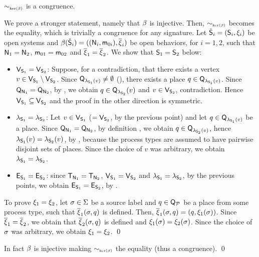 \begin{lemmaE}[][category=proofs]\label{lemma:cong-sys-beh}
  $\sim_{\scriptscriptstyle{\mathrm{ker}(\beta)}}$ is a \hrtext{} congruence. 
\end{lemmaE}
\begin{proofE}
  We prove a stronger statement, namely that $\beta$ is
  injective. Then, $\sim_{\scriptscriptstyle{\mathrm{ker}(\beta)}}$ becomes the equality, which is
  trivially a congruence for any signature. Let $\check{\mathsf{S}}_i =
  (\mathsf{S}_i,\xi_i)$ be open systems and
  $\beta({\check{\mathsf{S}}_i})=((\mathsf{N}_i,\mathsf{m}_{0i}),\overline{\xi}_i)$
  be open behaviors, for $i=1,2$, such that $\mathsf{N}_1=\mathsf{N}_2$,
  $\mathsf{m}_{01}=\mathsf{m}_{02}$ and
  $\overline{\xi}_1=\overline{\xi}_2$. We show that
  $\mathsf{S}_1=\mathsf{S}_2$ below: \begin{itemize}
  \item $\mathsf{V}_{\mathsf{S}_1}=\mathsf{V}_{\mathsf{S}_2}$: Suppose, for a
    contradiction, that there exists a vertex $v \in \mathsf{V}_{\mathsf{S}_1}
    \setminus \mathsf{V}_{\mathsf{S}_2}$. Since
    $\mathsf{Q}_{\lambda_{\mathsf{S}_1}(v)}\neq\emptyset$
    (), there exists a place
    $q\in\mathsf{Q}_{\lambda_{\mathsf{S}_1}(v)}$. Since
    $\mathsf{Q}_{\mathsf{N}_1}=\mathsf{Q}_{\mathsf{N}_2}$, by 
    , we obtain $q\in\mathsf{Q}_{\lambda_{\mathsf{S}_2}}(v)$
    and $v \in \mathsf{V}_{\mathsf{S}_2}$, contradiction. Hence
    $\mathsf{V}_{\mathsf{S}_1} \subseteq \mathsf{V}_{\mathsf{S}_2}$ and the proof in the
    other direction is symmetric.
  \item $\lambda_{\mathsf{S}_1}=\lambda_{\mathsf{S}_2}$: Let $v \in
    \mathsf{V}_{\mathsf{S}_1}$ ($= \mathsf{V}_{\mathsf{S}_2}$, by the previous point)
    and let $q \in \mathsf{Q}_{\lambda_{\mathsf{S}_1}(v)}$ be a place. Since
    $\mathsf{Q}_{\mathsf{N}_1}=\mathsf{Q}_{\mathsf{N}_2}$, by definition
    , we obtain $q \in
    \mathsf{Q}_{\lambda_{\mathsf{S}_2}(v)}$, hence
    $\lambda_{\mathsf{S}_1}(v)=\lambda_{\mathsf{S}_2}(v)$, by
    , \ie because the process types are
    assumed to have pairwise disjoint sets of places. Since the choice
    of $v$ was arbitrary, we obtain
    $\lambda_{\mathsf{S}_1}=\lambda_{\mathsf{S}_2}$. 
  \item $\mathsf{E}_{\mathsf{S}_1} = \mathsf{E}_{\mathsf{S}_2}$: since
    $\mathsf{T}_{\mathsf{N}_1}=\mathsf{T}_{\mathsf{N}_2}$,
    $\mathsf{V}_{\mathsf{S}_1}=\mathsf{V}_{\mathsf{S}_2}$ and
    $\lambda_{\mathsf{S}_1}=\lambda_{\mathsf{S}_2}$, by the previous points, we
    obtain $\mathsf{E}_{\mathsf{S}_1} = \mathsf{E}_{\mathsf{S}_2}$, by
    . 
  \end{itemize}
  To prove $\xi_1 = \xi_2$, let $\sigma \in \Sigma$ be
  a source label and $q \in \mathsf{Q}_{\mathcal{P}}$ be a place from some
  process type, such that $\overline{\xi}_1(\sigma,q)$ is
  defined. Then, $\overline{\xi}_1(\sigma,q) =
  (q,\xi_1(\sigma))$. Since $\overline{\xi}_1 =
  \overline{\xi}_2$, we obtain that
  $\overline{\xi}_2(\sigma,q)$ is defined and
  $\xi_1(\sigma)=\xi_2(\sigma)$. Since the choice of $\sigma$
  was arbitrary, we obtain $\xi_1 = \xi_2$. \qed
\end{proofE}
\begin{proofSketch}
  In fact $\beta$ is injective making $\sim_{\scriptscriptstyle{\mathrm{ker}(\beta)}}$ the equality
  (thus a congruence).
  \qed
\end{proofSketch}

